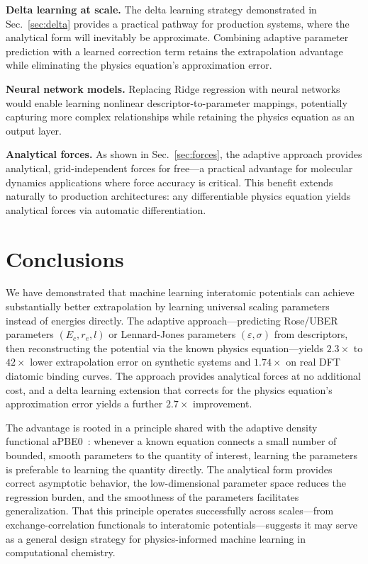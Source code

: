 \documentclass[aps,prb,twocolumn,superscriptaddress,longbibliography,floatfix]{revtex4-2}
\begin{document}
\textbf{Delta learning at scale.} The delta learning strategy demonstrated in Sec.~\ref{sec:delta} provides a practical pathway for production systems, where the analytical form will inevitably be approximate. Combining adaptive parameter prediction with a learned correction term retains the extrapolation advantage while eliminating the physics equation's approximation error.

\textbf{Neural network models.} Replacing Ridge regression with neural networks would enable learning nonlinear descriptor-to-parameter mappings, potentially capturing more complex relationships while retaining the physics equation as an output layer.

\textbf{Analytical forces.} As shown in Sec.~\ref{sec:forces}, the adaptive approach provides analytical, grid-independent forces for free---a practical advantage for molecular dynamics applications where force accuracy is critical. This benefit extends naturally to production architectures: any differentiable physics equation yields analytical forces via automatic differentiation.


\section{Conclusions}
\label{sec:conclusions}

We have demonstrated that machine learning interatomic potentials can achieve substantially better extrapolation by learning universal scaling parameters instead of energies directly. The adaptive approach---predicting Rose/UBER parameters $(E_c, r_e, l)$ or Lennard-Jones parameters $(\varepsilon, \sigma)$ from descriptors, then reconstructing the potential via the known physics equation---yields $2.3\times$ to $42\times$ lower extrapolation error on synthetic systems and $1.74\times$ on real DFT diatomic binding curves. The approach provides analytical forces at no additional cost, and a delta learning extension that corrects for the physics equation's approximation error yields a further $2.7\times$ improvement.

The advantage is rooted in a principle shared with the adaptive density functional aPBE0~\cite{Khan2025}: whenever a known equation connects a small number of bounded, smooth parameters to the quantity of interest, learning the parameters is preferable to learning the quantity directly. The analytical form provides correct asymptotic behavior, the low-dimensional parameter space reduces the regression burden, and the smoothness of the parameters facilitates generalization. That this principle operates successfully across scales---from exchange-correlation functionals to interatomic potentials---suggests it may serve as a general design strategy for physics-informed machine learning in computational chemistry.
\end{document}
